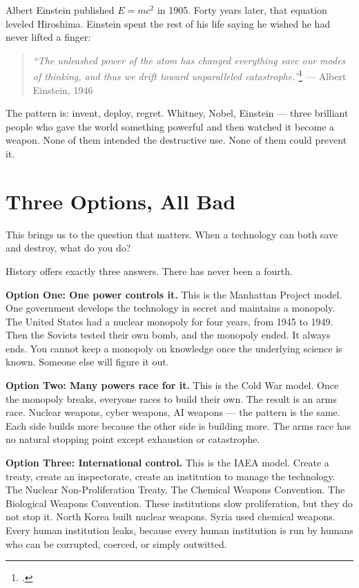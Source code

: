 Albert Einstein published $E = mc^2$ in 1905. Forty years later, that equation leveled Hiroshima. Einstein spent the rest of his life saying he wished he had never lifted a finger:

\begin{quote}
\textit{``The unleashed power of the atom has changed everything save our modes of thinking, and thus we drift toward unparalleled catastrophe.''}\footcite{einstein1960peace} --- Albert Einstein, 1946
\end{quote}

The pattern is: invent, deploy, regret. Whitney, Nobel, Einstein --- three brilliant people who gave the world something powerful and then watched it become a weapon. None of them intended the destructive use. None of them could prevent it.

\section*{Three Options, All Bad}
\label{pos08:three-options-all-bad}

This brings us to the question that matters. When a technology can both save and destroy, what do you do?

History offers exactly three answers. There has never been a fourth.

\textbf{Option One: One power controls it.} This is the Manhattan Project model. One government develops the technology in secret and maintains a monopoly. The United States had a nuclear monopoly for four years, from 1945 to 1949. Then the Soviets tested their own bomb, and the monopoly ended. It always ends. You cannot keep a monopoly on knowledge once the underlying science is known. Someone else will figure it out.

\textbf{Option Two: Many powers race for it.} This is the Cold War model. Once the monopoly breaks, everyone races to build their own. The result is an arms race. Nuclear weapons, cyber weapons, AI weapons --- the pattern is the same. Each side builds more because the other side is building more. The arms race has no natural stopping point except exhaustion or catastrophe.

\textbf{Option Three: International control.} This is the IAEA model. Create a treaty, create an inspectorate, create an institution to manage the technology. The Nuclear Non-Proliferation Treaty. The Chemical Weapons Convention. The Biological Weapons Convention. These institutions slow proliferation, but they do not stop it. North Korea built nuclear weapons. Syria used chemical weapons. Every human institution leaks, because every human institution is run by humans who can be corrupted, coerced, or simply outwitted.

